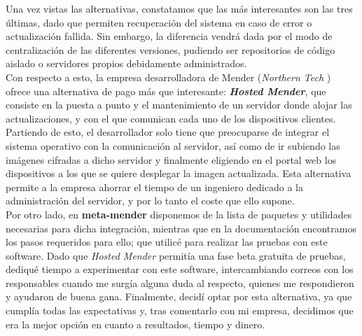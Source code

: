 Una vez vistas las alternativas, constatamos que las más interesantes son las tres últimas, dado que permiten recuperación del sistema en caso de error o actualización fallida. Sin embargo, la diferencia vendrá dada por el modo de centralización de las diferentes versiones, pudiendo ser repositorios de código aislado o servidores propios debidamente administrados.\\

Con respecto a esto, la empresa desarrolladora de Mender (\textit{Northern Tech} \cite{northern-tech}) ofrece una alternativa de pago más que interesante: \textbf{\textit{Hosted Mender}}, que consiste en la puesta a punto y el mantenimiento de un servidor donde alojar las actualizaciones, y con el que comunican cada uno de los dispositivos clientes. Partiendo de esto, el desarrollador solo tiene que preocuparse de integrar el sistema operativo con la comunicación al servidor, así como de ir subiendo las imágenes cifradas a dicho servidor y finalmente eligiendo en el portal web los dispositivos a los que se quiere desplegar la imagen actualizada. Esta alternativa permite a la empresa ahorrar el tiempo de un ingeniero dedicado a la administración del servidor, y por lo tanto el coste que ello supone.\\

Por otro lado, en \textbf{meta-mender} \cite{meta-mender} disponemos de la lista de paquetes y utilidades necesarias para dicha integración, mientras que en la documentación \cite{docs-mender} encontramos los pasos requeridos para ello; que utilicé para realizar las pruebas con este software. Dado que \textit{Hosted Mender} permitía una fase beta gratuita de pruebas, dediqué tiempo a experimentar con este software, intercambiando correos con los responsables cuando me surgía alguna duda al respecto, quienes me respondieron y ayudaron de buena gana. Finalmente, decidí optar por esta alternativa, ya que cumplía todas las expectativas y, tras comentarlo con mi empresa, decidimos que era la mejor opción en cuanto a resultados, tiempo y dinero.

\newpage

